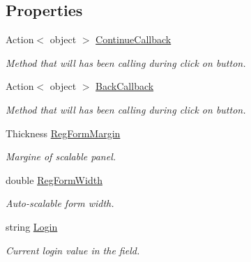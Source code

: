 \subsection*{Properties}
\begin{DoxyCompactItemize}
\item 
Action$<$ object $>$ \mbox{\hyperlink{class_wpf_handler_1_1_u_i_1_1_controls_1_1_logon_1_1_registration_panel_abaec8de066eb2e0300849e2d649aa451}{Continue\+Callback}}
\begin{DoxyCompactList}\small\item\em Method that will has been calling during click on button. \end{DoxyCompactList}\item 
Action$<$ object $>$ \mbox{\hyperlink{class_wpf_handler_1_1_u_i_1_1_controls_1_1_logon_1_1_registration_panel_a52f6e9d84b5d3011ddb8313426fd06ab}{Back\+Callback}}
\begin{DoxyCompactList}\small\item\em Method that will has been calling during click on button. \end{DoxyCompactList}\item 
Thickness \mbox{\hyperlink{class_wpf_handler_1_1_u_i_1_1_controls_1_1_logon_1_1_registration_panel_ad05f4bb773e52b1715229a854cf3a8ad}{Reg\+Form\+Margin}}
\begin{DoxyCompactList}\small\item\em Margine of scalable panel. \end{DoxyCompactList}\item 
double \mbox{\hyperlink{class_wpf_handler_1_1_u_i_1_1_controls_1_1_logon_1_1_registration_panel_a91323c1b7f498e79c891dbb9a968537d}{Reg\+Form\+Width}}
\begin{DoxyCompactList}\small\item\em Auto-\/scalable form width. \end{DoxyCompactList}\item 
string \mbox{\hyperlink{class_wpf_handler_1_1_u_i_1_1_controls_1_1_logon_1_1_registration_panel_a8cb28db1c4476e3261428c359171aa1b}{Login}}
\begin{DoxyCompactList}\small\item\em Current login value in the field. \end{DoxyCompactList}\item 

\end{DoxyCompactItemize}
